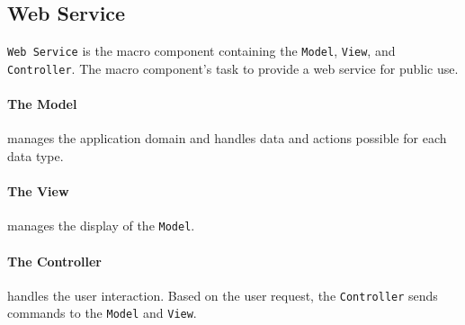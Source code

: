 \subsection*{Web Service}\label{arch:webservice}
\texttt{Web Service} is the macro component containing the \texttt{Model}, \texttt{View}, and \texttt{Controller}.
The macro component's task to provide a web service for public use.

\paragraph{The Model} manages the application domain and handles data and actions possible for each data type.

\paragraph{The View} manages the display of the \texttt{Model}.

\paragraph{The Controller} handles the user interaction. Based on the user request, the \texttt{Controller} sends commands to the \texttt{Model} and \texttt{View}.